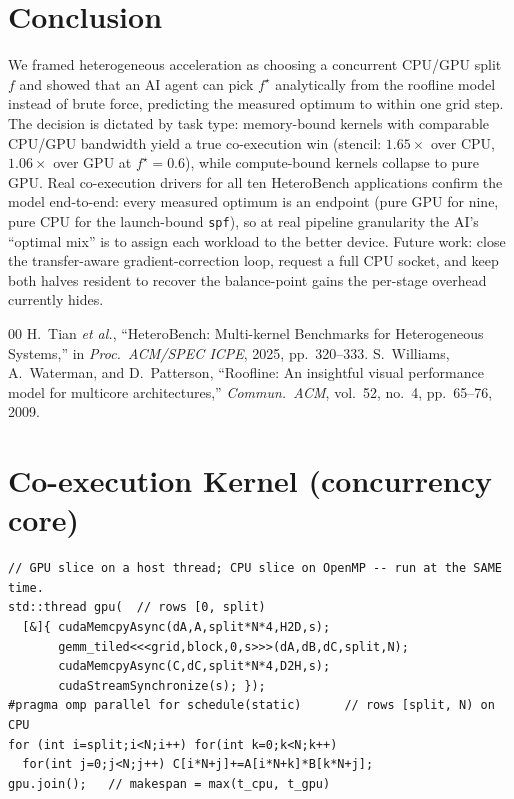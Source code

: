 \documentclass[conference]{IEEEtran}
\newcommand{\mainbodyendpage}{?}
\begin{document}
\section{Conclusion}

We framed heterogeneous acceleration as choosing a concurrent CPU/GPU split $f$ and showed
that an AI agent can pick $f^\star$ analytically from the roofline model instead of brute
force, predicting the measured optimum to within one grid step. The decision is dictated by
task type: memory-bound kernels with comparable CPU/GPU bandwidth yield a true
co-execution win (stencil: $1.65\times$ over CPU, $1.06\times$ over GPU at $f^\star{=}0.6$),
while compute-bound kernels collapse to pure GPU. Real co-execution drivers for all ten
HeteroBench applications confirm the model end-to-end: every measured optimum is an
endpoint (pure GPU for nine, pure CPU for the launch-bound \texttt{spf}), so at real
pipeline granularity the AI's ``optimal mix'' is to assign each workload to the better
device. Future work: close the transfer-aware gradient-correction loop, request a full CPU
socket, and keep both halves resident to recover the balance-point gains the per-stage
overhead currently hides.

\begin{thebibliography}{00}
 H.~Tian \emph{et al.}, ``HeteroBench: Multi-kernel Benchmarks for
Heterogeneous Systems,'' in \emph{Proc.\ ACM/SPEC ICPE}, 2025, pp.\ 320--333.
 S.~Williams, A.~Waterman, and D.~Patterson, ``Roofline: An insightful
visual performance model for multicore architectures,'' \emph{Commun.\ ACM}, vol.\ 52,
no.\ 4, pp.\ 65--76, 2009.
\end{thebibliography}

\xdef\mainbodyendpage{\thepage}

\appendices

\section{Co-execution Kernel (concurrency core)}
\begin{lstlisting}
// GPU slice on a host thread; CPU slice on OpenMP -- run at the SAME time.
std::thread gpu(  // rows [0, split)
  [&]{ cudaMemcpyAsync(dA,A,split*N*4,H2D,s);
       gemm_tiled<<<grid,block,0,s>>>(dA,dB,dC,split,N);
       cudaMemcpyAsync(C,dC,split*N*4,D2H,s);
       cudaStreamSynchronize(s); });
#pragma omp parallel for schedule(static)      // rows [split, N) on CPU
for (int i=split;i<N;i++) for(int k=0;k<N;k++)
  for(int j=0;j<N;j++) C[i*N+j]+=A[i*N+k]*B[k*N+j];
gpu.join();   // makespan = max(t_cpu, t_gpu)
\end{lstlisting}
\end{document}
